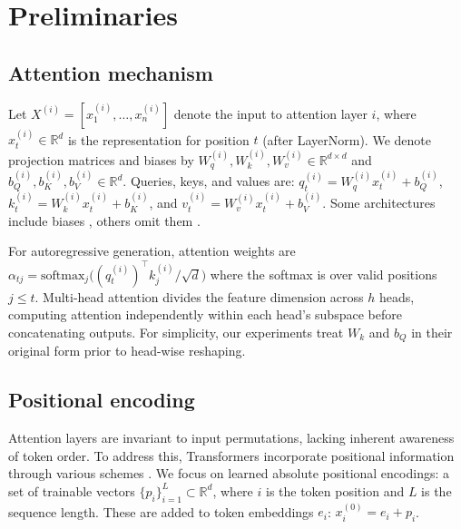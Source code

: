 \documentclass[11pt]{article}
\newif\ifYRMcomments
\newcommand{\YTODO}[1]{\ifYRMcomments\textcolor{pink}{[TODO for Yuval: #1]}\fi}
\newcommand{\YRM}[1]{\ifYRMcomments\textcolor{red}{[YRM: #1]}\fi}
\begin{document}
\section{Preliminaries}
\YTODO{Write about the input (the sentence we are using)}
\subsection{Attention mechanism}
Let $X^{(i)}=[x_1^{(i)},\ldots,x_n^{(i)}]$ denote the input to attention layer $i$, where $x_t^{(i)}\in\mathbb{R}^{d}$ is the representation for position $t$ (after LayerNorm). We denote projection matrices and biases by $W_q^{(i)},W_k^{(i)},W_v^{(i)}\in\mathbb{R}^{d\times d}$ and $b_Q^{(i)},b_K^{(i)},b_V^{(i)}\in\mathbb{R}^{d}$. Queries, keys, and values are: $q_t^{(i)}=W_q^{(i)}x_t^{(i)} + b_Q^{(i)}$, $k_t^{(i)}=W_k^{(i)}x_t^{(i)} + b_K^{(i)}$, and $v_t^{(i)}=W_v^{(i)}x_t^{(i)} + b_V^{(i)}$. Some architectures include biases \cite{vaswani2017attention}, others omit them \cite{touvron2023llama2}. \YRM{Verify and add more specific citations for bias usage patterns}

For autoregressive generation, attention weights are $\alpha_{t j}=\mathrm{softmax}_j\!\big((q_t^{(i)})^\top k_j^{(i)} / \sqrt{d}\big)$ \YRM{I changed the transpose here to be on the Q, please make sure that OK (this is better for later). Make sure this changes fit all other places/notations)}where the softmax is over valid positions $j \le t$. Multi-head attention divides the feature dimension across $h$ heads, 
computing attention independently within each head's subspace before 
concatenating outputs. For simplicity, our experiments treat $W_k$ and $b_Q$ in their original form prior to head-wise reshaping.

\subsection{Positional encoding}
Attention layers are invariant to input permutations, lacking inherent awareness of token order. To address this, Transformers incorporate positional information through various schemes \YRM{Cite all in RW}. We focus on learned absolute positional encodings: a set of trainable vectors $\{p_i\}_{i=1}^{L} \subset \mathbb{R}^{d}$, where $i$ is the token position and $L$ is the sequence length. These are added to token embeddings $e_i$: $x_i^{(0)} = e_i + p_i$.
\end{document}
